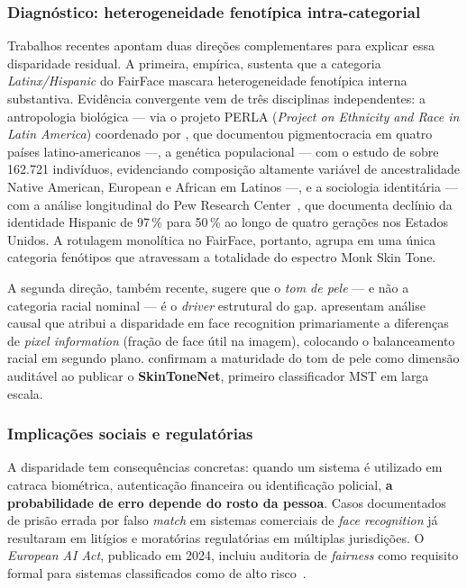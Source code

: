 \subsubsection{Diagnóstico: heterogeneidade fenotípica intra-categorial}
\label{sec:problema_heterogeneidade}

Trabalhos recentes apontam duas direções complementares para explicar essa disparidade residual. A primeira, empírica, sustenta que a categoria \emph{Latinx/Hispanic} do FairFace mascara heterogeneidade fenotípica interna substantiva. Evidência convergente vem de três disciplinas independentes: a antropologia biológica --- via o projeto PERLA (\emph{Project on Ethnicity and Race in Latin America}) coordenado por \textcite{telles2014pigmentocrac}, que documentou pigmentocracia em quatro países latino-americanos ---, a genética populacional --- com o estudo de \textcite{bryc2015genetic} sobre 162.721 indivíduos, evidenciando composição altamente variável de ancestralidade Native American, European e African em Latinos ---, e a sociologia identitária --- com a análise longitudinal do Pew Research Center~\autocite{lopez2017hispanic}, que documenta declínio da identidade Hispanic de 97\,\% para 50\,\% ao longo de quatro gerações nos Estados Unidos. A rotulagem monolítica no FairFace, portanto, agrupa em uma única categoria fenótipos que atravessam a totalidade do espectro Monk Skin Tone.

A segunda direção, também recente, sugere que o \emph{tom de pele} --- e não a categoria racial nominal --- é o \emph{driver} estrutural do gap. \textcite{pangelinan2023exploring} apresentam análise causal que atribui a disparidade em face recognition primariamente a diferenças de \emph{pixel information} (fração de face útil na imagem), colocando o balanceamento racial em segundo plano. \textcite{matias2026large} confirmam a maturidade do tom de pele como dimensão auditável ao publicar o \textbf{SkinToneNet}, primeiro classificador MST em larga escala.

\subsubsection{Implicações sociais e regulatórias}
\label{sec:problema_sociais}

A disparidade tem consequências concretas: quando um sistema é utilizado em catraca biométrica, autenticação financeira ou identificação policial, \textbf{a probabilidade de erro depende do rosto da pessoa}. Casos documentados de prisão errada por falso \emph{match} em sistemas comerciais de \emph{face recognition} já resultaram em litígios e moratórias regulatórias em múltiplas jurisdições. O \emph{European AI Act}, publicado em 2024, incluiu auditoria de \emph{fairness} como requisito formal para sistemas classificados como de alto risco~\autocite{lafargue2025fairness}.

